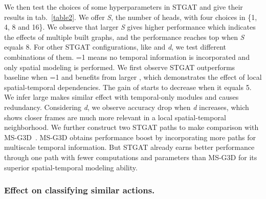 \documentclass[runningheads]{llncs}
\begin{document}
We then test the choices of some hyperparameters in STGAT and give their results in tab.~\ref{table2}. We offer \textit{S}, the number of heads, with four choices in \{1, 4, 8 and 16\}. We observe that larger \textit{S} gives higher performance which indicates the effects of multiple built graphs, and the performance reaches top when \textit{S} equals 8. For other STGAT configurations, like  and \textit{d}, we test different combinations of them. =1 means no temporal information is incorporated and only spatial modeling is performed. We first observe STGAT outperforms baseline when =1 and benefits from larger , which demonstrates the effect of local spatial-temporal dependencies. The gain of  starts to decrease when it equals 5. We infer large  makes similar effect with temporal-only modules and causes redundancy. Considering \textit{d}, we observe accuracy drop when \textit{d} increases, which shows closer frames are much more relevant in a local spatial-temporal neighborhood. We further construct two STGAT paths to make comparison with MS-G3D~\cite{liu2020disentangling}. MS-G3D obtains performance boost by incorporating more paths for multiscale temporal information. But STGAT already earns better performance through one path with fewer computations and parameters than MS-G3D for its superior spatial-temporal modeling ability.

\subsubsection{Effect on classifying similar actions.}
\end{document}
